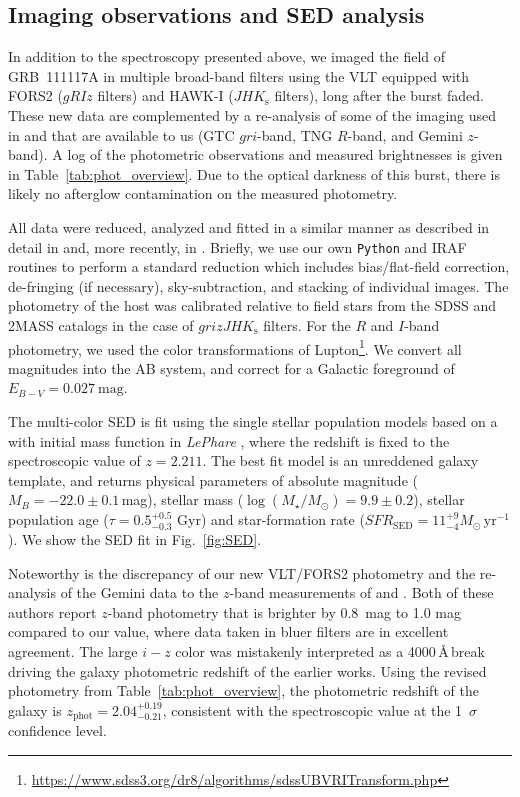 \documentclass{aa}    %
\begin{document}
\subsection{Imaging observations and SED analysis} \label{SED}

In addition to the spectroscopy presented above, we imaged the field of
GRB~111117A in multiple broad-band filters using the VLT equipped with FORS2
($gRIz$ filters) and HAWK-I ($JHK_{\mathrm{s}}$ filters), long after the burst
faded. These new data are complemented by a re-analysis of some of the imaging
used in \citet{Margutti2012} and \citet{Sakamoto2013} that are available to us
(GTC $gri$-band, TNG $R$-band, and Gemini $z$-band). A log of the photometric
observations and measured brightnesses is given in
Table~\ref{tab:phot_overview}. Due to the optical darkness of this burst, there
is likely no afterglow contamination on the measured photometry.

All data were reduced, analyzed and fitted in a similar manner as described in
detail in \citet{Kruhler2011a} and, more recently, in \citet{Schulze2016}.
Briefly, we use our own \texttt{Python} and IRAF routines to perform a standard
reduction which includes bias/flat-field correction, de-fringing (if necessary),
sky-subtraction, and stacking of individual images. The photometry of the host
was calibrated relative to field stars from the SDSS and 2MASS catalogs in the
case of $grizJHK_{\mathrm{s}}$ filters.
For the $R$ and $I$-band photometry, we used the color transformations of
Lupton\footnote{\url{https://www.sdss3.org/dr8/algorithms/sdssUBVRITransform.php}}. 
We convert all magnitudes into the AB system, and correct for a Galactic 
foreground of $E_{B-V}=0.027~\mathrm{mag}$.



The multi-color SED is fit using the \citet{Bruzual2003} single stellar population
models based on a \citet{Chabrier2003} with initial mass function in
\emph{LePhare} \citep{Ilbert2006}, where the redshift is fixed to the
spectroscopic value of $z=2.211$. The best fit model is an unreddened galaxy
template, and returns physical parameters of absolute magnitude
($M_B=-22.0\pm0.1$\,mag), stellar mass ($\log(M_{\star}/M_\odot) = 9.9\pm0.2$),
stellar population age ($\tau = 0.5_{-0.3}^{+0.5}$ Gyr) and star-formation rate
($SFR_{\mathrm{SED}}=11_{-4}^{+9} M_\odot\,\mathrm{yr}^{-1}$). We show the SED
fit in Fig.~\ref{fig:SED}.

Noteworthy is the discrepancy of our new VLT/FORS2 photometry and the
re-analysis of the Gemini data to the $z$-band measurements of
\citet{Margutti2012} and \citet{Sakamoto2013}. Both of these authors report
$z$-band photometry that is brighter by 0.8~mag to 1.0 mag compared to our
value, where data taken in bluer filters are in excellent agreement. The large
$i-z$ color was mistakenly interpreted as a 4000\,\AA\,break driving the galaxy
photometric redshift of the earlier works. Using the revised photometry from
Table~\ref{tab:phot_overview}, the photometric redshift of the galaxy is
$z_{\mathrm{phot}}=2.04_{-0.21}^{+0.19}$, consistent with the spectroscopic
value at the 1~$\sigma$ confidence level.
\end{document}

